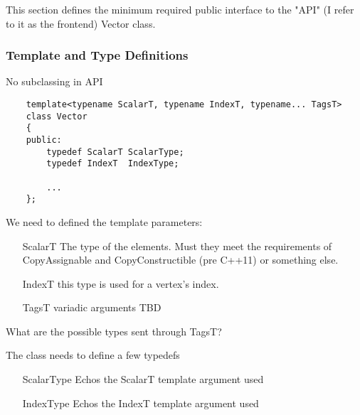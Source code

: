 This section defines the minimum required public interface to the "API" (I refer to it
as the frontend) Vector class.  

\subsubsection{Template and Type Definitions}

No subclassing in API

\begin{verbatim}
    template<typename ScalarT, typename IndexT, typename... TagsT>
    class Vector
    {
    public:
        typedef ScalarT ScalarType;
        typedef IndexT  IndexType;

        ...
    };
\end{verbatim}

We need to defined the template parameters:
\begin{itemize}[leftmargin=1.1in]
\item[\sf ScalarT]  The type of the elements.  Must they meet the requirements of CopyAssignable and CopyConstructible (pre C++11) or something else.  
\item[\sf IndexT] this type is used for a vertex’s index. 
\item[\sf TagsT] variadic arguments TBD
\end{itemize}

What are the possible types sent through TagsT?

The class needs to define a few typedefs
\begin{itemize}[leftmargin=1.1in]
\item[\sf ScalarType] Echos the ScalarT template argument used
\item[\sf IndexType]  Echos the IndexT template argument used
\end{itemize}




